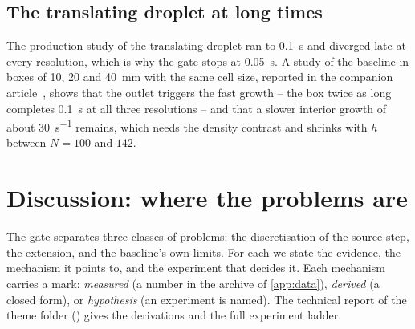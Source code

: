 \documentclass[preprint,3p,11pt]{elsarticle}
\begin{document}
\begin{table}[t]
  \centering
  \caption{The serial checks of the gate: the largest column-scaled difference to the
  four-rank run.}
  \label{tab:gateseam}
  
\end{table}

\subsection{The translating droplet at long times}
\label{sec:res-translating}
The production study of the translating droplet ran to \SI{0.1}{s} and diverged late at
every resolution, which is why the gate stops at \SI{0.05}{s}. A study of the baseline in
boxes of 10, 20 and \SI{40}{mm} with the same cell size, reported in the companion
article~\cite{maric2026sl}, shows that the outlet triggers the fast growth -- the box
twice as long completes \SI{0.1}{s} at all three resolutions -- and that a slower interior
growth of about \SI{30}{s^{-1}} remains, which needs the density contrast and shrinks with
$h$ between $N=100$ and $142$.

\section{Discussion: where the problems are}
\label{sec:discussion}

The gate separates three classes of problems: the discretisation of the source step,
the extension, and the baseline's own limits. For each we state the evidence, the
mechanism it points to, and the experiment that decides it. Each mechanism carries a
mark: \emph{measured} (a number in the archive of \ref{app:data}), \emph{derived} (a
closed form), or \emph{hypothesis} (an experiment is named). The technical report of
the theme folder () gives the
derivations and the full experiment ladder.
\end{document}
